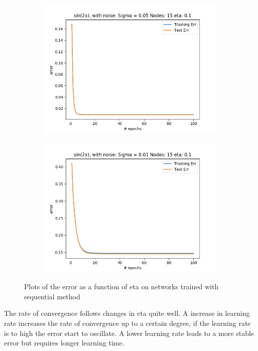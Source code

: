 \documentclass{article}
\begin{document}
\begin{figure}[ht!]
\begin{subfigure}[t]{0.4\textwidth}
        \includegraphics[width=1\textwidth]{plots/noise/seq_sin2x_15nodes_sigma1_error_per_epoch_eta005.png}
        \caption{}
    \end{subfigure}
    \begin{subfigure}[t]{0.4\textwidth}
        \centering
        \includegraphics[width=1\textwidth]{plots/noise/seq_sin2x_15nodes_sigma1_error_per_epoch_eta001.png}
        \caption{}
    \end{subfigure}
    \caption{Plots of the error as a function of eta on networks trained with sequential method}
\end{figure}

The rate of convergence follows changes in eta quite well. A increase in learning rate increases the rate of convergence up to a certain degree, if the learning rate is to high the error start to oscillate. A lower learning rate leads to a more stable error but requires longer learning time.
\end{document}
